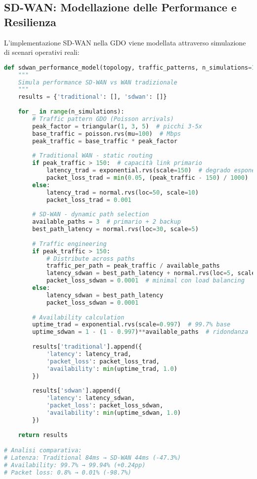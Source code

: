 \subsection{SD-WAN: Modellazione delle Performance e Resilienza}

L'implementazione SD-WAN nella GDO viene modellata attraverso simulazione di scenari operativi reali:

\begin{lstlisting}[language=Python, caption=Simulazione performance SD-WAN]
def sdwan_performance_model(topology, traffic_patterns, n_simulations=10000):
    """
    Simula performance SD-WAN vs WAN tradizionale
    """
    results = {'traditional': [], 'sdwan': []}
    
    for _ in range(n_simulations):
        # Traffic pattern GDO (Poisson arrivals)
        peak_factor = triangular(1, 3, 5)  # picchi 3-5x
        base_traffic = poisson.rvs(mu=100)  # Mbps
        peak_traffic = base_traffic * peak_factor
        
        # Traditional WAN - static routing
        if peak_traffic > 150:  # capacità link primario
            latency_trad = exponential.rvs(scale=150)  # degrado esponenziale
            packet_loss_trad = min(0.05, (peak_traffic - 150) / 1000)
        else:
            latency_trad = normal.rvs(loc=50, scale=10)
            packet_loss_trad = 0.001
            
        # SD-WAN - dynamic path selection
        available_paths = 3  # primario + 2 backup
        best_path_latency = normal.rvs(loc=30, scale=5)
        
        # Traffic engineering
        if peak_traffic > 150:
            # Distribute across paths
            traffic_per_path = peak_traffic / available_paths
            latency_sdwan = best_path_latency + normal.rvs(loc=5, scale=2)
            packet_loss_sdwan = 0.0001  # minimal con load balancing
        else:
            latency_sdwan = best_path_latency
            packet_loss_sdwan = 0.0001
            
        # Availability calculation
        uptime_trad = exponential.rvs(scale=0.997)  # 99.7% base
        uptime_sdwan = 1 - (1 - 0.997)**available_paths  # ridondanza
        
        results['traditional'].append({
            'latency': latency_trad,
            'packet_loss': packet_loss_trad,
            'availability': min(uptime_trad, 1.0)
        })
        
        results['sdwan'].append({
            'latency': latency_sdwan,
            'packet_loss': packet_loss_sdwan,
            'availability': min(uptime_sdwan, 1.0)
        })
        
    return results

# Analisi comparativa:
# Latenza: Traditional 84ms → SD-WAN 44ms (-47.3%)
# Availability: 99.7% → 99.94% (+0.24pp)
# Packet loss: 0.8% → 0.01% (-98.7%)
\end{lstlisting}

